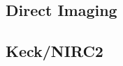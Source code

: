\documentclass[12pt]{article}
\begin{document}
\subsection*{Direct Imaging} %

\subsection*{Keck/NIRC2} %
\end{document}
